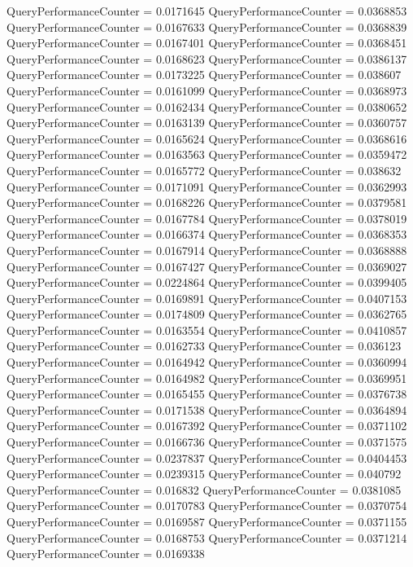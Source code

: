 \documentclass[9pt]{article}
\theoremstyle{plain}
\theoremstyle{definition}
\theoremstyle{remark}
\numberwithin{equation}{section}
\begin{document}
QueryPerformanceCounter  =  0.0171645
QueryPerformanceCounter  =  0.0368853
QueryPerformanceCounter  =  0.0167633
QueryPerformanceCounter  =  0.0368839
QueryPerformanceCounter  =  0.0167401
QueryPerformanceCounter  =  0.0368451
QueryPerformanceCounter  =  0.0168623
QueryPerformanceCounter  =  0.0386137
QueryPerformanceCounter  =  0.0173225
QueryPerformanceCounter  =  0.038607
QueryPerformanceCounter  =  0.0161099
QueryPerformanceCounter  =  0.0368973
QueryPerformanceCounter  =  0.0162434
QueryPerformanceCounter  =  0.0380652
QueryPerformanceCounter  =  0.0163139
QueryPerformanceCounter  =  0.0360757
QueryPerformanceCounter  =  0.0165624
QueryPerformanceCounter  =  0.0368616
QueryPerformanceCounter  =  0.0163563
QueryPerformanceCounter  =  0.0359472
QueryPerformanceCounter  =  0.0165772
QueryPerformanceCounter  =  0.038632
QueryPerformanceCounter  =  0.0171091
QueryPerformanceCounter  =  0.0362993
QueryPerformanceCounter  =  0.0168226
QueryPerformanceCounter  =  0.0379581
QueryPerformanceCounter  =  0.0167784
QueryPerformanceCounter  =  0.0378019
QueryPerformanceCounter  =  0.0166374
QueryPerformanceCounter  =  0.0368353
QueryPerformanceCounter  =  0.0167914
QueryPerformanceCounter  =  0.0368888
QueryPerformanceCounter  =  0.0167427
QueryPerformanceCounter  =  0.0369027
QueryPerformanceCounter  =  0.0224864
QueryPerformanceCounter  =  0.0399405
QueryPerformanceCounter  =  0.0169891
QueryPerformanceCounter  =  0.0407153
QueryPerformanceCounter  =  0.0174809
QueryPerformanceCounter  =  0.0362765
QueryPerformanceCounter  =  0.0163554
QueryPerformanceCounter  =  0.0410857
QueryPerformanceCounter  =  0.0162733
QueryPerformanceCounter  =  0.036123
QueryPerformanceCounter  =  0.0164942
QueryPerformanceCounter  =  0.0360994
QueryPerformanceCounter  =  0.0164982
QueryPerformanceCounter  =  0.0369951
QueryPerformanceCounter  =  0.0165455
QueryPerformanceCounter  =  0.0376738
QueryPerformanceCounter  =  0.0171538
QueryPerformanceCounter  =  0.0364894
QueryPerformanceCounter  =  0.0167392
QueryPerformanceCounter  =  0.0371102
QueryPerformanceCounter  =  0.0166736
QueryPerformanceCounter  =  0.0371575
QueryPerformanceCounter  =  0.0237837
QueryPerformanceCounter  =  0.0404453
QueryPerformanceCounter  =  0.0239315
QueryPerformanceCounter  =  0.040792
QueryPerformanceCounter  =  0.016832
QueryPerformanceCounter  =  0.0381085
QueryPerformanceCounter  =  0.0170783
QueryPerformanceCounter  =  0.0370754
QueryPerformanceCounter  =  0.0169587
QueryPerformanceCounter  =  0.0371155
QueryPerformanceCounter  =  0.0168753
QueryPerformanceCounter  =  0.0371214
QueryPerformanceCounter  =  0.0169338
\end{document}
